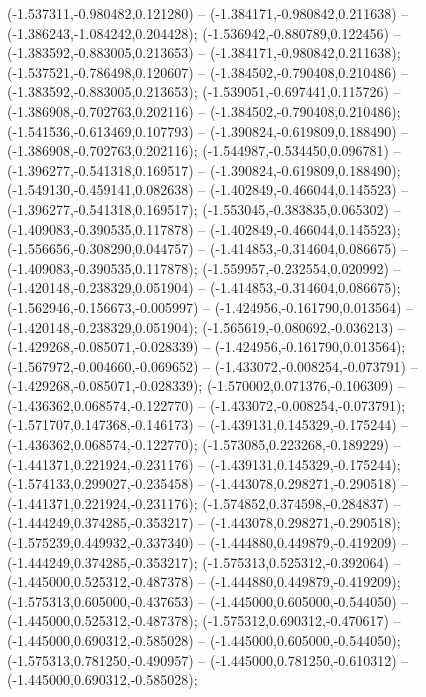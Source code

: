  (-1.537311,-0.980482,0.121280) -- (-1.384171,-0.980842,0.211638) -- (-1.386243,-1.084242,0.204428);
 (-1.536942,-0.880789,0.122456) -- (-1.383592,-0.883005,0.213653) -- (-1.384171,-0.980842,0.211638);
 (-1.537521,-0.786498,0.120607) -- (-1.384502,-0.790408,0.210486) -- (-1.383592,-0.883005,0.213653);
 (-1.539051,-0.697441,0.115726) -- (-1.386908,-0.702763,0.202116) -- (-1.384502,-0.790408,0.210486);
 (-1.541536,-0.613469,0.107793) -- (-1.390824,-0.619809,0.188490) -- (-1.386908,-0.702763,0.202116);
 (-1.544987,-0.534450,0.096781) -- (-1.396277,-0.541318,0.169517) -- (-1.390824,-0.619809,0.188490);
 (-1.549130,-0.459141,0.082638) -- (-1.402849,-0.466044,0.145523) -- (-1.396277,-0.541318,0.169517);
 (-1.553045,-0.383835,0.065302) -- (-1.409083,-0.390535,0.117878) -- (-1.402849,-0.466044,0.145523);
 (-1.556656,-0.308290,0.044757) -- (-1.414853,-0.314604,0.086675) -- (-1.409083,-0.390535,0.117878);
 (-1.559957,-0.232554,0.020992) -- (-1.420148,-0.238329,0.051904) -- (-1.414853,-0.314604,0.086675);
 (-1.562946,-0.156673,-0.005997) -- (-1.424956,-0.161790,0.013564) -- (-1.420148,-0.238329,0.051904);
 (-1.565619,-0.080692,-0.036213) -- (-1.429268,-0.085071,-0.028339) -- (-1.424956,-0.161790,0.013564);
 (-1.567972,-0.004660,-0.069652) -- (-1.433072,-0.008254,-0.073791) -- (-1.429268,-0.085071,-0.028339);
 (-1.570002,0.071376,-0.106309) -- (-1.436362,0.068574,-0.122770) -- (-1.433072,-0.008254,-0.073791);
 (-1.571707,0.147368,-0.146173) -- (-1.439131,0.145329,-0.175244) -- (-1.436362,0.068574,-0.122770);
 (-1.573085,0.223268,-0.189229) -- (-1.441371,0.221924,-0.231176) -- (-1.439131,0.145329,-0.175244);
 (-1.574133,0.299027,-0.235458) -- (-1.443078,0.298271,-0.290518) -- (-1.441371,0.221924,-0.231176);
 (-1.574852,0.374598,-0.284837) -- (-1.444249,0.374285,-0.353217) -- (-1.443078,0.298271,-0.290518);
 (-1.575239,0.449932,-0.337340) -- (-1.444880,0.449879,-0.419209) -- (-1.444249,0.374285,-0.353217);
 (-1.575313,0.525312,-0.392064) -- (-1.445000,0.525312,-0.487378) -- (-1.444880,0.449879,-0.419209);
 (-1.575313,0.605000,-0.437653) -- (-1.445000,0.605000,-0.544050) -- (-1.445000,0.525312,-0.487378);
 (-1.575312,0.690312,-0.470617) -- (-1.445000,0.690312,-0.585028) -- (-1.445000,0.605000,-0.544050);
 (-1.575313,0.781250,-0.490957) -- (-1.445000,0.781250,-0.610312) -- (-1.445000,0.690312,-0.585028);
